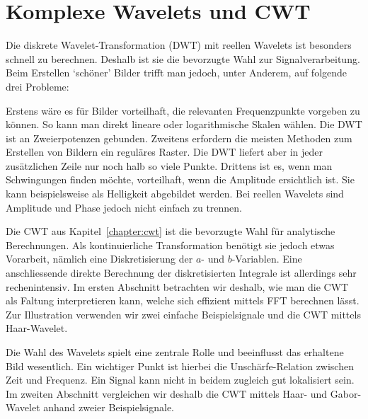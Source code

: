 %
%
%

\chapter{Komplexe Wavelets und CWT\label{chapter:complex}}
\begin{refsection}

Die diskrete Wavelet-Transformation (DWT) mit reellen Wavelets ist besonders schnell zu berechnen.
Deshalb ist sie die bevorzugte Wahl zur Signalverarbeitung.
Beim Erstellen `schöner' Bilder trifft man jedoch, unter Anderem, auf folgende drei Probleme:

Erstens wäre es für Bilder vorteilhaft, die relevanten Frequenzpunkte vorgeben zu können.
So kann man direkt lineare oder logarithmische Skalen wählen. Die DWT ist an Zweierpotenzen gebunden. %
Zweitens erfordern die meisten Methoden zum Erstellen von Bildern ein reguläres Raster.
Die DWT liefert aber in jeder zusätzlichen Zeile nur noch halb so viele Punkte.
Drittens ist es, wenn man Schwingungen finden möchte, vorteilhaft, wenn die Amplitude ersichtlich ist.
Sie kann beispielsweise als Helligkeit abgebildet werden. 
Bei reellen Wavelets sind Amplitude und Phase jedoch nicht einfach zu trennen.

Die CWT aus Kapitel~\ref{chapter:cwt} ist die bevorzugte Wahl für analytische Berechnungen.
Als kontinuierliche Transformation benötigt sie jedoch etwas Vorarbeit,
nämlich eine Diskretisierung der $a$- und $b$-Variablen.
Eine anschliessende direkte Berechnung der diskretisierten Integrale ist allerdings sehr rechenintensiv.
Im ersten Abschnitt betrachten wir deshalb, wie man die CWT als Faltung interpretieren kann, welche sich effizient mittels FFT berechnen lässt.
Zur Illustration verwenden wir zwei einfache Beispielsignale und die CWT mittels Haar-Wavelet.

Die Wahl des Wavelets spielt eine zentrale Rolle und beeinflusst das erhaltene Bild wesentlich.
Ein wichtiger Punkt ist hierbei die Unschärfe-Relation zwischen Zeit und Frequenz.
Ein Signal kann nicht in beidem zugleich gut lokalisiert sein.
Im zweiten Abschnitt vergleichen wir deshalb die CWT mittels Haar- und Gabor-Wavelet anhand zweier Beispielsignale.


\end{refsection}
